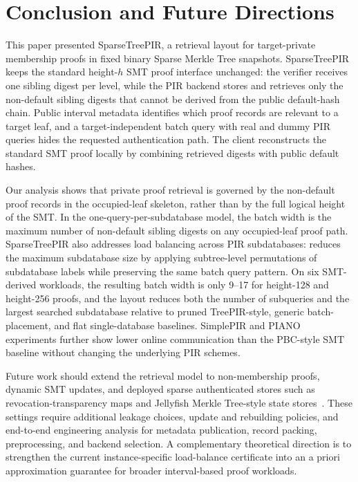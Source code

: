 \section{Conclusion and Future Directions}
\label{sec:conclusion}

This paper presented SparseTreePIR, a retrieval layout for target-private membership proofs in fixed binary Sparse Merkle Tree snapshots. SparseTreePIR keeps the standard height-$h$ SMT proof interface unchanged: the verifier receives one sibling digest per level, while the PIR backend stores and retrieves only the non-default sibling digests that cannot be derived from the public default-hash chain. Public interval metadata identifies which proof records are relevant to a target leaf, and a target-independent batch query with real and dummy PIR queries hides the requested authentication path. The client reconstructs the standard SMT proof locally by combining retrieved digests with public default hashes.

Our analysis shows that private proof retrieval is governed by the non-default proof records in the occupied-leaf skeleton, rather than by the full logical height of the SMT. In the one-query-per-subdatabase model, the batch width is the maximum number of non-default sibling digests on any occupied-leaf proof path. SparseTreePIR also addresses load balancing across PIR subdatabases: \ActiveBalance{} reduces the maximum subdatabase size by applying subtree-level permutations of subdatabase labels while preserving the same batch query pattern. On six SMT-derived workloads, the resulting batch width is only 9--17 for height-128 and height-256 proofs, and the layout reduces both the number of subqueries and the largest searched subdatabase relative to pruned TreePIR-style, generic batch-placement, and flat single-database baselines. SimplePIR and PIANO experiments further show lower online communication than the PBC-style SMT baseline without changing the underlying PIR schemes.

Future work should extend the retrieval model to non-membership proofs, dynamic SMT updates, and deployed sparse authenticated stores such as revocation-transparency maps and Jellyfish Merkle Tree-style state stores~\cite{revtrans,jmt}. These settings require additional leakage choices, update and rebuilding policies, and end-to-end engineering analysis for metadata publication, record packing, preprocessing, and backend selection. A complementary theoretical direction is to strengthen the current instance-specific load-balance certificate into an a priori approximation guarantee for broader interval-based proof workloads.

